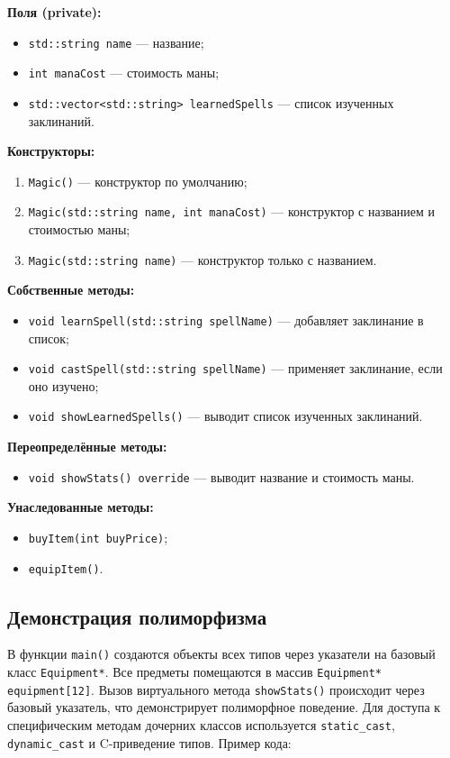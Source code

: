 \documentclass[oneside,a4paper,14pt]{extarticle}
\begin{document}
\textbf{Поля (private):}
\begin{itemize}
    \item \texttt{std::string name} — название;
    \item \texttt{int manaCost} — стоимость маны;
    \item \texttt{std::vector<std::string> learnedSpells} — список изученных заклинаний.
\end{itemize}

\textbf{Конструкторы:}
\begin{enumerate}
    \item \texttt{Magic()} — конструктор по умолчанию;
    \item \texttt{Magic(std::string name, int manaCost)} — конструктор с названием и стоимостью маны;
    \item \texttt{Magic(std::string name)} — конструктор только с названием.
\end{enumerate}

\textbf{Собственные методы:}
\begin{itemize}
    \item \texttt{void learnSpell(std::string spellName)} — добавляет заклинание в список;
    \item \texttt{void castSpell(std::string spellName)} — применяет заклинание, если оно изучено;
    \item \texttt{void showLearnedSpells()} — выводит список изученных заклинаний.
\end{itemize}

\textbf{Переопределённые методы:}
\begin{itemize}
    \item \texttt{void showStats() override} — выводит название и стоимость маны.
\end{itemize}

\textbf{Унаследованные методы:}
\begin{itemize}
    \item \texttt{buyItem(int buyPrice)};
    \item \texttt{equipItem()}.
\end{itemize}

\subsection*{Демонстрация полиморфизма}
В функции \texttt{main()} создаются объекты всех типов через указатели на базовый класс \texttt{Equipment*}. Все предметы помещаются в массив \texttt{Equipment* equipment[12]}. Вызов виртуального метода \texttt{showStats()} происходит через базовый указатель, что демонстрирует полиморфное поведение. Для доступа к специфическим методам дочерних классов используется \texttt{static\_cast}, \texttt{dynamic\_cast} и C-приведение типов. Пример кода:
\end{document}
